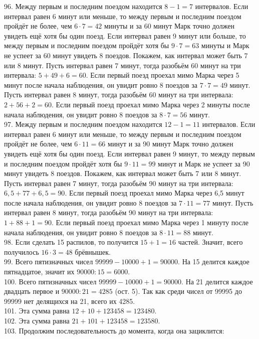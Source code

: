 96. Между первым и последним поездом находится $8-1=7$ интервалов. Если интервал равен 6 минут или меньше, то между первым и последним поездом пройдёт не более, чем $6\cdot7=42$ минуты и за 60 минут Марк точно должен увидеть ещё хотя бы один поезд. Если интервал равен 9 минут или больше, то между первым и последним поездом пройдёт хотя бы $9\cdot7=63$ минуты и Марк не успеет за 60 минут увидеть 8 поездов. Покажем, как интервал может быть 7 или 8 минут. Пусть интервал равен 7 минут, тогда разобьём 60 минут на три интервала: $5+49+6=60.$ Если первый поезд проехал мимо Марка через 5 минут после начала наблюдения, он увидит ровно 8 поездов за $7\cdot7=49$ минут. Пусть интервал равен 8 минут, тогда разобьём 60 минут на три интервала: $2+56+2=60.$ Если первый поезд проехал мимо Марка через 2 минуты после начала наблюдения, он увидит ровно 8 поездов за $8\cdot7=56$ минут.\\
97. Между первым и последним поездом находится $12-1=11$ интервалов. Если интервал равен 6 минут или меньше, то между первым и последним поездом пройдёт не более, чем $6\cdot11=66$ минут и за 90 минут Марк точно должен увидеть ещё хотя бы один поезд. Если интервал равен 9 минут, то между первым и последним поездом пройдёт хотя бы $9\cdot11=99$ минут и Марк не успеет за 90 минут увидеть 8 поездов. Покажем, как интервал может быть 7 или 8 минут. Пусть интервал равен 7 минут, тогда разобьём 90 минут на три интервала: $6,5+77+6,5=90.$ Если первый поезд проехал мимо Марка через 6,5 минут после начала наблюдения, он увидит ровно 8 поездов за $7\cdot11=77$ минут. Пусть интервал равен 8 минут, тогда разобьём 90 минут на три интервала: $1+88+1=90.$ Если первый поезд проехал мимо Марка через 1 минуту после начала наблюдения, он увидит ровно 8 поездов за $8\cdot11=88$ минут.\\
98. Если сделать 15 распилов, то получится $15+1=16$ частей. Значит, всего получилось $16\cdot3=48$ брёвнышек.\\
99. Всего пятизначных чисел $99999-10000+1=90000.$ На 15 делится каждое пятнадцатое, значит их $90000:15=6000.$\\
100. Всего пятизначных чисел $99999-10000+1=90000.$ На 21 делится каждое двадцать первое и $90000:21=4285$ (ост. 5). Так как среди чисел от 99995 до 99999 нет делящихся на 21, всего их 4285.\\
101. Эта сумма равна $12+10+123458=123480.$\\
102. Эта сумма равна $21+101+123458=123580.$\\
103. Продолжим последовательность до момента, когда она зациклится:
